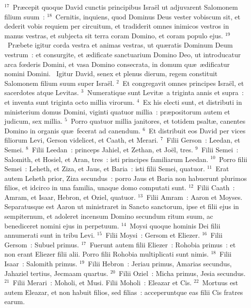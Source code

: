 ${}^{17}$~Pr\ae cepit quoque David cunctis principibus Isra\"el ut adjuvarent Salomonem filium suum~:
${}^{18}$~Cernitis, inquiens, quod Dominus Deus vester vobiscum sit, et dederit vobis requiem per circuitum, et tradiderit omnes inimicos vestros in manus vestras, et subjecta sit terra coram Domino, et coram populo ejus.
${}^{19}$~Pr\ae bete igitur corda vestra et animas vestras, ut qu\ae ratis Dominum Deum vestrum~: et consurgite, et \ae dificate sanctuarium Domino Deo, ut introducatur arca fœderis Domini, et vasa Domino consecrata, in domum qu\ae\ \ae dificatur nomini Domini.
~Igitur David, senex et plenus dierum, regem constituit Salomonem filium suum super Isra\"el.
${}^{2}$~Et congregavit omnes principes Isra\"el, et sacerdotes atque Levitas.
${}^{3}$~Numeratique sunt Levit\ae\ a triginta annis et supra~: et inventa sunt triginta octo millia virorum.
${}^{4}$~Ex his electi sunt, et distributi in ministerium domus Domini, viginti quatuor millia~: pr\ae positorum autem et judicum, sex millia.
${}^{5}$~Porro quatuor millia janitores, et totidem psalt\ae , canentes Domino in organis qu\ae\ fecerat ad canendum.
${}^{6}$~Et distribuit eos David per vices filiorum Levi, Gerson videlicet, et Caath, et Merari.
${}^{7}$~Filii Gerson~: Leedan, et Semei.
${}^{8}$~Filii Leedan~: princeps Jahiel, et Zethan, et Jo\"el, tres.
${}^{9}$~Filii Semei~: Salomith, et Hosiel, et Aran, tres~: isti principes familiarum Leedan.
${}^{10}$~Porro filii Semei~: Leheth, et Ziza, et Jaus, et Baria~: isti filii Semei, quatuor.
${}^{11}$~Erat autem Leheth prior, Ziza secundus~: porro Jaus et Baria non habuerunt plurimos filios, et idcirco in una familia, unaque domo computati sunt.
${}^{12}$~Filii Caath~: Amram, et Isaar, Hebron, et Oziel, quatuor.
${}^{13}$~Filii Amram~: Aaron et Moyses. Separatusque est Aaron ut ministraret in Sancto sanctorum, ipse et filii ejus in sempiternum, et adoleret incensum Domino secundum ritum suum, ac benediceret nomini ejus in perpetuum.
${}^{14}$~Moysi quoque hominis Dei filii annumerati sunt in tribu Levi.
${}^{15}$~Filii Moysi~: Gersom et Eliezer.
${}^{16}$~Filii Gersom~: Subuel primus.
${}^{17}$~Fuerunt autem filii Eliezer~: Rohobia primus~: et non erant Eliezer filii alii. Porro filii Rohobia multiplicati sunt nimis.
${}^{18}$~Filii Isaar~: Salomith primus.
${}^{19}$~Filii Hebron~: Jeriau primus, Amarias secundus, Jahaziel tertius, Jecmaam quartus.
${}^{20}$~Filii Oziel~: Micha primus, Jesia secundus.
${}^{21}$~Filii Merari~: Moholi, et Musi. Filii Moholi~: Eleazar et Cis.
${}^{22}$~Mortuus est autem Eleazar, et non habuit filios, sed filias~: acceperuntque eas filii Cis fratres earum.
